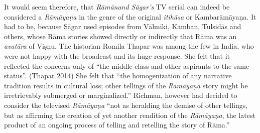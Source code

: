 It would seem therefore, that \textit{Rāmānand Sāgar’s} TV serial can indeed be considered a \textit{Rāmāyaṇa} in the genre of the original \textit{itihāsa} or Kambarāmāyaņa. It had to be, because Sāgar used episodes from Vālmīki, Kamban, Tulsidās and others, whose Rāma stories showed directly or indirectly that Rāma was an \textit{avatāra} of Viṣṇu. The historian Romila Thapar was among the few in India, who were not happy with the broadcast and its huge response. She felt that it reflected the concerns only of “the middle class and other aspirants to the same status”. (Thapar 2014) She felt that “the homogenization of any narrative tradition results in cultural loss; other tellings of the \textit{Rāmāyaṇa} story might be irretrievably submerged or marginalized.” Richman, however had decided to consider the televised \textit{Rāmāyaṇa} “not as heralding the demise of other tellings, but as affirming the creation of yet another rendition of the \textit{Rāmāyaṇa}, the latest product of an ongoing process of telling and retelling the story of Rāma.”

